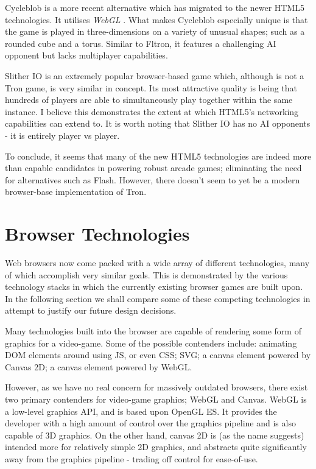 \documentclass[class=article, crop=false]{standalone}
\begin{document}
		Cycleblob \parencite{Cycleblob} is a more recent alternative which has migrated to the newer HTML5 technologies. It utilises \emph{WebGL} \parencite{WebGl}. What makes Cycleblob especially unique is that the game is played in three-dimensions on a variety of unusual shapes; such as a rounded cube and a torus. Similar to Fltron, it features a challenging AI opponent but lacks multiplayer capabilities.

		Slither IO \parencite{SlitherIo} is an extremely popular browser-based game which, although is not a Tron game, is very similar in concept. Its most attractive quality is being that hundreds of players are able to simultaneously play together within the same instance. I believe this demonstrates the extent at which HTML5's networking capabilities can extend to. It is worth noting that Slither IO has no AI opponents - it is entirely player vs player.

		To conclude, it seems that many of the new HTML5 technologies are indeed more than capable candidates in powering robust arcade games; eliminating the need for alternatives such as Flash. However, there doesn't seem to yet be a modern browser-base implementation of Tron.

	\label{sec:browserTechnologies}
	\section{Browser Technologies}
		Web browsers now come packed with a wide array of different technologies, many of which accomplish very similar goals. This is demonstrated by the various technology stacks in which the currently existing browser games are built upon. In the following section we shall compare some of these competing technologies in attempt to justify our future design decisions.

		Many technologies built into the browser are capable of rendering some form of graphics for a video-game. Some of the possible contenders include: animating DOM elements around using JS, or even CSS; SVG; a canvas element powered by Canvas 2D; a canvas element powered by WebGL.

		However, as we have no real concern for massively outdated browsers, there exist two primary contenders for video-game graphics; WebGL and Canvas. WebGL is a low-level graphics API, and is based upon OpenGL ES. It provides the developer with a high amount of control over the graphics pipeline and is also capable of 3D graphics. On the other hand, canvas 2D is (as the name suggests) intended more for relatively simple 2D graphics, and abstracts quite significantly away from the graphics pipeline - trading off control for ease-of-use.
\end{document}
